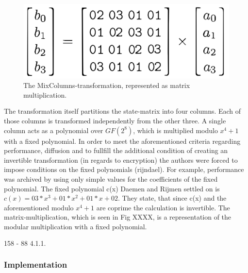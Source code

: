 \begin{figure}
\centering
\includegraphics[scale = 0.2]{data/figures/mixcolumn.png} 
\caption{The MixColumns-transformation, represented as matrix multiplication.}
\end{figure}

The transformation itself partitions the
state-matrix into four columns. Each of those columns is transformed
independently from the other three. A single column acts as a polynomial
over $GF(2^{8})$, which is multiplied modulo $x^4 + 1$ with a fixed polynomial. In
order to meet the aforementioned criteria regarding performance,
diffusion and to fullfill the additional condition of creating an
invertible transformation (in regards to encryption) the authors were
forced to impose conditions on the fixed polynomials (rijndael). For
example, performance was archived by using only simple values for the
coefficients of the fixed polynomial. The fixed polynomial c(x) Daemen
and Rijmen settled on is $c(x) = 03 * x^3 + 01 * x^2 + 01 * x + 02$. They
state, that since c(x) and the aforementioned modulo $x^4+1$ are coprime
the calculation is invertible. The matrix-multiplication, which is seen
in Fig XXXX, is a representation of the modular multiplication with a
fixed polynomial.

158 - 88 4.1.1. 

\hypertarget{implementation-4}{%
\subsubsection{Implementation}\label{implementation-4}}

